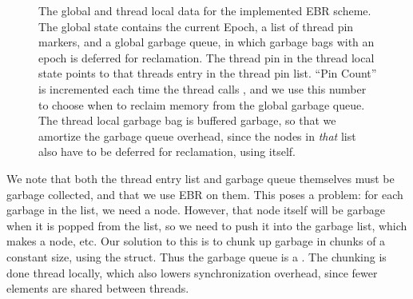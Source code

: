 \documentclass[b5paper]{report}
\begin{document}
\begin{figure}[ht!]
  \caption{The global and thread local data for the implemented EBR scheme. The
    global state contains the current Epoch, a list of thread pin markers, and a
    global garbage queue, in which garbage bags with an epoch is deferred for
    reclamation.  The thread pin in the thread local state points to that
    threads entry in the thread pin list. ``Pin Count'' is incremented each time
    the thread calls , and we use this number to choose when to
    reclaim memory from the global garbage queue. The thread local garbage bag
    is buffered garbage, so that we amortize the garbage queue overhead, since
    the nodes in \emph{that} list also have to be deferred for reclamation,
    using itself.\label{fig:ebr-impl}}
\end{figure}

We note that both the thread entry list and garbage queue themselves must be garbage
collected, and that we use EBR on them. This poses a problem: for each
garbage in the list, we need a node. However, that node itself will be garbage
when it is popped from the list, so we need to push it into the garbage list,
which makes a node, etc. Our solution to this is to chunk up garbage in chunks
of a constant size, using the  struct. Thus the garbage queue is a
. The chunking is done thread locally, which also
lowers synchronization overhead, since fewer elements are shared between threads.
\end{document}
